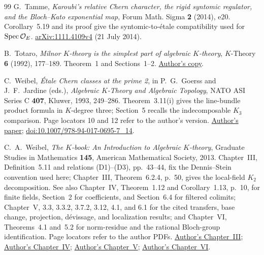 \begin{thebibliography}{99}
G.~Tamme, \emph{Karoubi's relative Chern character, the rigid syntomic regulator, and the Bloch--Kato exponential map},
Forum Math. Sigma \textbf{2} (2014), e20.
Corollary~5.19 and its proof give the syntomic-to-\'etale compatibility used for $\operatorname{Spec}\mathcal O_E$.
\href{https://arxiv.org/abs/1111.4109v4}{arXiv:1111.4109v4}
(21 July 2014).

B.~Totaro, \emph{Milnor $K$-theory is the simplest part of algebraic
$K$-theory}, $K$-Theory \textbf{6} (1992), 177--189.
Theorem~1 and Sections~1--2.
\href{https://www.math.ucla.edu/~totaro/papers/public_html/milnor.pdf}
{Author's copy}.

C.~Weibel, \emph{\'Etale Chern classes at the prime 2},
in P.~G.~Goerss and J.~F.~Jardine (eds.),
\emph{Algebraic $K$-Theory and Algebraic Topology},
NATO ASI Series C \textbf{407}, Kluwer, 1993, 249--286.
Theorem~3.11(i) gives the line-bundle product formula in $K$-degree three;
Section~5 recalls the indecomposable $K_3$ comparison.
Page locators 10 and 12 refer to the author's version.
\href{https://sites.math.rutgers.edu/~weibel/archive/papers-dir/chernclass.pdf}{Author's paper};
\href{https://doi.org/10.1007/978-94-017-0695-7_14}{doi:10.1007/978-94-017-0695-7\_14}.

C.~A.~Weibel, \emph{The $K$-book: An Introduction to Algebraic $K$-theory}, Graduate Studies in Mathematics \textbf{145}, American Mathematical Society, 2013.
Chapter~III, Definition~5.11 and relations (D1)--(D3), pp.~43--44,
fix the Dennis--Stein convention used here; Chapter~III,
Theorem~6.2.4, p.~50, gives the local-field $K_2$ decomposition.
See also Chapter~IV, Theorem~1.12 and Corollary~1.13, p.~10,
for finite fields, Section~2 for coefficients, and Section~6.4
for filtered colimits; Chapter~V, 3.3, 3.3.2, 3.7.2, 3.12,
4.1, and 6.1 for the cited transfers, base change, projection,
d\'evissage, and localization results; and Chapter~VI,
Theorems~4.1 and~5.2 for norm-residue and the rational
Bloch-group identification. Page locators refer to the author PDFs.
\href{https://sites.math.rutgers.edu/~weibel/Kbook/Kbook.III.pdf}{Author's Chapter~III};
\href{https://sites.math.rutgers.edu/~weibel/Kbook/Kbook.IV.pdf}{Author's Chapter~IV};
\href{https://sites.math.rutgers.edu/~weibel/Kbook/Kbook.V.pdf}{Author's Chapter~V};
\href{https://sites.math.rutgers.edu/~weibel/Kbook/Kbook.VI.pdf}{Author's Chapter~VI}.
\end{thebibliography}
